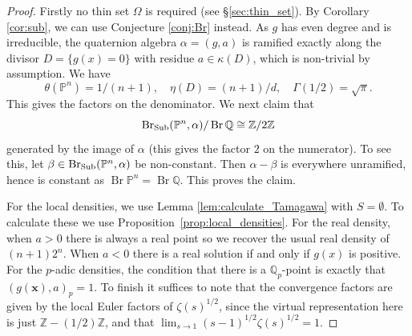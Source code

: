 \documentclass[a4paper,12pt,reqno]{amsart}
\numberwithin{equation}{section} \numberwithin{figure}{section}
\DeclareMathOperator{\Br}{Br} \DeclareMathOperator{\Brnr}{Br_{nr}}
\newcommand{\x}{\mathbf{x}}
\renewcommand\P{\mathbb{P}}
\newcommand\Z{\mathbb{Z}}
\newcommand\Q{\mathbb{Q}}
\renewcommand{\#}{\sharp}
\theoremstyle{definition}
\numberwithin{lemma}{section}
\begin{document}
\begin{proof}
	Firstly no thin set $\Omega$ is required (see \S \ref{sec:thin_set}).
	By Corollary \ref{cor:sub}, we can use Conjecture \ref{conj:Br} instead.
	As $g$ has even degree and is irreducible,
	the quaternion algebra $\alpha = (g,a)$
	is ramified exactly along the divisor $D = \{ g(x) = 0\}$ with residue
	$a \in \kappa(D)$, which is non-trivial by assumption. We have
	$$\theta(\P^n) = 1/(n+1), \quad \eta(D) = (n+1)/d, \quad \Gamma(1/2) = \sqrt{\pi}.$$
	This gives the factors on the denominator. We next claim that
	$$\Sub(\P^n,\alpha) /\Br \Q \cong \Z/2\Z$$
	generated by the image of $\alpha$ (this gives the factor $2$ on the numerator). To see this, 
	let $\beta \in \Sub(\P^n,\alpha)$ be non-constant. Then $\alpha - \beta$ is everywhere
	unramified, hence is constant as $\Br \P^n = \Br \Q$. This proves the claim.
	
	For the local densities, we use Lemma \ref{lem:calculate_Tamagawa} with $S = \emptyset$.
	To calculate these we use Proposition~\ref{prop:local_densities}. 
	For the real density, when
	$a > 0$ there is always a real point so we recover the usual real density of $(n+1)2^n$.
	When $a < 0$ there is a real solution if and only if $g(x)$ is positive. 
	For the $p$-adic densities, the condition that there is a $\Q_p$-point
	is exactly that $(g(\x),a)_p = 1$.
	To finish it suffices to note that the convergence factors are given by the local Euler
	factors of $\zeta(s)^{1/2}$, since the virtual representation here is just 
	$\Z - (1/2)\Z$, and that $\lim_{s \to 1}(s-1)^{1/2} \zeta(s)^{1/2} = 1$.
\end{proof}
\end{document}
